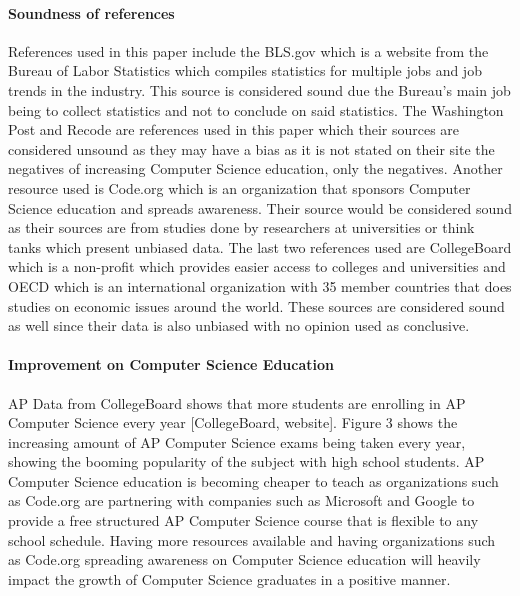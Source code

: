 \documentclass[12pt, letterpaper]{report}
\begin{document}
\paragraph*{Soundness of references \\}
References used in this paper include the BLS.gov which is a website from the Bureau of Labor Statistics which compiles statistics for multiple jobs and job trends in the industry. This source is considered sound due the Bureau's main job being to collect statistics and not to conclude on said statistics. The Washington Post and Recode are references used in this paper which their sources are considered unsound as they may have a bias as it is not stated on their site the negatives of increasing Computer Science education, only the negatives. Another resource used is Code.org which is an organization that sponsors Computer Science education and spreads awareness. Their source would be considered sound as their sources are from studies done by researchers at universities or think tanks which present unbiased data. The last two references used are CollegeBoard which is a non-profit which provides easier access to colleges and universities and OECD which is an international organization with 35 member countries that does studies on economic issues around the world. These sources are considered sound as well since their data is also unbiased with no opinion used as conclusive. 

\paragraph*{Improvement on Computer Science Education \\}
AP Data from CollegeBoard shows that more students are enrolling in AP Computer Science every year [CollegeBoard, website]. Figure 3 shows the increasing amount of AP Computer Science exams being taken every year, showing the booming popularity of the subject with high school students. AP Computer Science education is becoming cheaper to teach as organizations such as Code.org are partnering with companies such as Microsoft and Google to provide a free structured AP Computer Science course that is flexible to any school schedule. Having more resources available and having organizations such as Code.org spreading awareness on Computer Science education will heavily impact the growth of Computer Science graduates in a positive manner.
\end{document}

